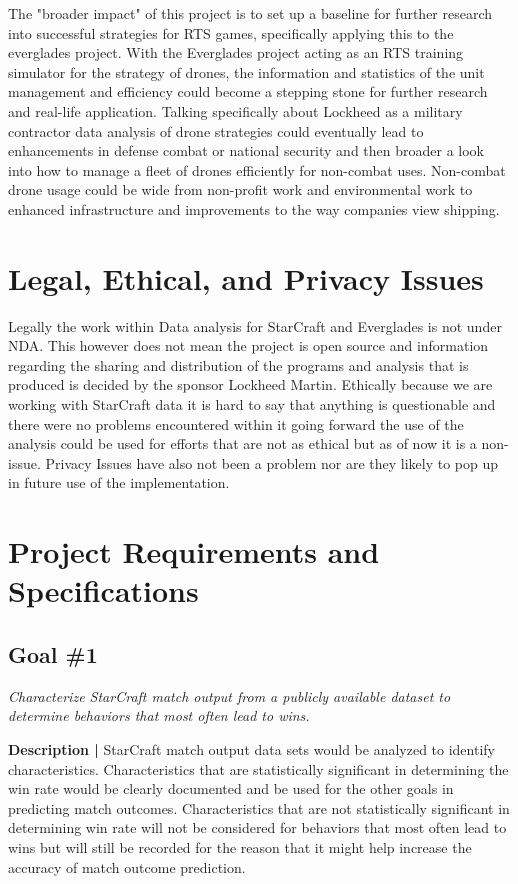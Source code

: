 \documentclass[a4paper,12pt]{report}
\begin{document}
The "broader impact" of this project is to set up a baseline for further research into successful strategies for RTS games, specifically applying this to the everglades project. With the Everglades project acting as an RTS training simulator for the strategy of drones, the information and statistics of the unit management and efficiency could become a stepping stone for further research and real-life application. Talking specifically about Lockheed as a military contractor data analysis of drone strategies could eventually lead to enhancements in defense combat or national security and then broader a look into how to manage a fleet of drones efficiently for non-combat uses. Non-combat drone usage could be wide from non-profit work and environmental work to enhanced infrastructure and improvements to the way companies view shipping.

\section{Legal, Ethical, and Privacy Issues}

Legally the work within Data analysis for StarCraft and Everglades is not under NDA. This however does not mean the project is open source and information regarding the sharing and distribution of the programs and analysis that is produced is decided by the sponsor Lockheed Martin. Ethically because we are working with StarCraft data it is hard to say that anything is questionable and there were no problems encountered within it going forward the use of the analysis could be used for efforts that are not as ethical but as of now it is a non-issue. Privacy Issues have also not been a problem nor are they likely to pop up in future use of the implementation.

\section{Project Requirements and Specifications}

\subsection{Goal \#1}

\textit{Characterize StarCraft match output from a publicly available dataset to determine behaviors that most often lead to wins.}

\textbf{Description |} StarCraft match output data sets would be analyzed to identify characteristics. Characteristics that are statistically significant in determining the win rate would be clearly documented and be used for the other goals in predicting match outcomes. Characteristics that are not statistically significant in determining win rate will not be considered for behaviors that most often lead to wins but will still be recorded for the reason that it might help increase the accuracy of match outcome prediction.
\end{document}
